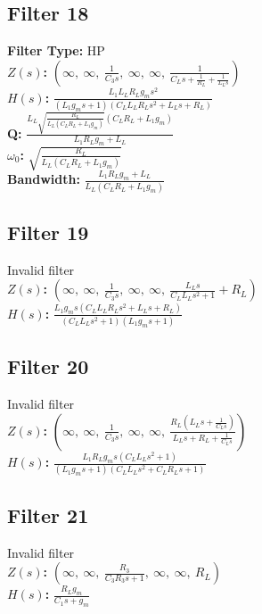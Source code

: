 \documentclass{article}
\begin{document}
\subsection*{Filter 18}
\textbf{Filter Type:} HP \\ 
\textbf{$Z(s)$:} $\left( \infty, \  \infty, \  \frac{1}{C_{3} s}, \  \infty, \  \infty, \  \frac{1}{C_{L} s + \frac{1}{R_{L}} + \frac{1}{L_{L} s}}\right)$ \\ 
\textbf{$H(s)$:} $\frac{L_{1} L_{L} R_{L} g_{m} s^{2}}{\left(L_{1} g_{m} s + 1\right) \left(C_{L} L_{L} R_{L} s^{2} + L_{L} s + R_{L}\right)}$ \\ 
\textbf{Q:} $\frac{L_{L} \sqrt{\frac{R_{L}}{L_{L} \left(C_{L} R_{L} + L_{1} g_{m}\right)}} \left(C_{L} R_{L} + L_{1} g_{m}\right)}{L_{1} R_{L} g_{m} + L_{L}}$ \\ 
\textbf{$\omega_0$:} $\sqrt{\frac{R_{L}}{L_{L} \left(C_{L} R_{L} + L_{1} g_{m}\right)}}$ \\ 
\textbf{Bandwidth:} $\frac{L_{1} R_{L} g_{m} + L_{L}}{L_{L} \left(C_{L} R_{L} + L_{1} g_{m}\right)}$ \\ 
\subsection*{Filter 19}
Invalid filter \\ 
\textbf{$Z(s)$:} $\left( \infty, \  \infty, \  \frac{1}{C_{3} s}, \  \infty, \  \infty, \  \frac{L_{L} s}{C_{L} L_{L} s^{2} + 1} + R_{L}\right)$ \\ 
\textbf{$H(s)$:} $\frac{L_{1} g_{m} s \left(C_{L} L_{L} R_{L} s^{2} + L_{L} s + R_{L}\right)}{\left(C_{L} L_{L} s^{2} + 1\right) \left(L_{1} g_{m} s + 1\right)}$ \\ 
\subsection*{Filter 20}
Invalid filter \\ 
\textbf{$Z(s)$:} $\left( \infty, \  \infty, \  \frac{1}{C_{3} s}, \  \infty, \  \infty, \  \frac{R_{L} \left(L_{L} s + \frac{1}{C_{L} s}\right)}{L_{L} s + R_{L} + \frac{1}{C_{L} s}}\right)$ \\ 
\textbf{$H(s)$:} $\frac{L_{1} R_{L} g_{m} s \left(C_{L} L_{L} s^{2} + 1\right)}{\left(L_{1} g_{m} s + 1\right) \left(C_{L} L_{L} s^{2} + C_{L} R_{L} s + 1\right)}$ \\ 
\subsection*{Filter 21}
Invalid filter \\ 
\textbf{$Z(s)$:} $\left( \infty, \  \infty, \  \frac{R_{3}}{C_{3} R_{3} s + 1}, \  \infty, \  \infty, \  R_{L}\right)$ \\ 
\textbf{$H(s)$:} $\frac{R_{L} g_{m}}{C_{1} s + g_{m}}$ \\ 
\end{document}
